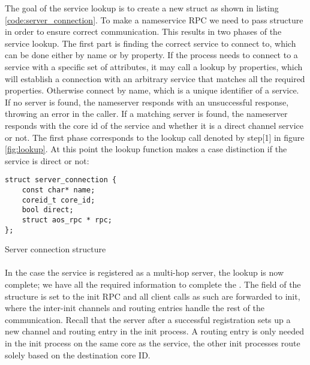 The goal of the service lookup is to create a new  struct as shown in listing \ref{code:server_connection}. To make a nameservice RPC we need to pass structure in order to ensure correct communication. This results in two phases of the service lookup. The first part is finding the correct service to connect to, which can be done either by name or by property. If the process needs to connect to a service with a specific set of attributes, it may call a lookup by properties, which will establish a connection with an arbitrary service that matches all the required properties. Otherwise connect by name, which is a unique identifier of a service. If no server is found, the nameserver responds with an unsuccessful response, throwing an error in the caller. If a matching server is found, the nameserver responds with the core id of the service and whether it is a direct channel service or not. The first phase corresponds to the lookup call denoted by step[1] in figure \ref{fig:lookup}. At this point the lookup function makes a case distinction if the service is direct or not:
\newline
\begin{code}
\begin{mdframed}[style=myframe]
\begin{verbatim}
struct server_connection {
	const char* name;
	coreid_t core_id;
	bool direct;
	struct aos_rpc * rpc;
};
\end{verbatim}
\end{mdframed}

\caption{Server connection structure}
\newline
\label{code:server_connection}
\end{code}


\paragraph{}
In the case the service is registered as a multi-hop server, the lookup is now complete; we have all the required information to complete the . The  field of the structure is set to the init RPC and all client calls as such are forwarded to init, where the inter-init channels and routing entries handle the rest of the communication. Recall that the server after a successful registration sets up a new channel and routing entry in the init process. A routing entry is only needed in the init process on the same core as the service, the other init processes route solely based on the destination core ID.
